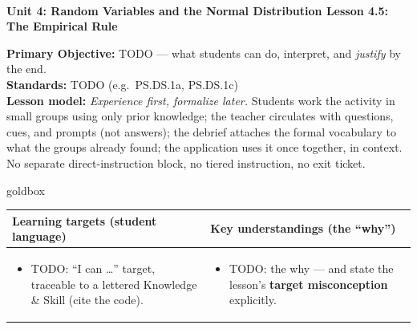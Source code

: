 \documentclass[10pt]{article}
\newcommand{\UnitNumberName}{Unit 4: Random Variables and the Normal Distribution \quad}
\newcommand{\LessonNumberName}{Lesson 4.5: The Empirical Rule}
\begin{document}
\begin{center}
    {\Large\bfseries \CourseName \\
    {\small\bfseries \UnitNumberName \LessonNumberName}}
\end{center}

\begin{tcolorbox}[colback=frost, colframe=cerulean, boxrule=0.9pt, arc=2mm,
    left=2mm, right=2mm, top=1.5mm, bottom=1.5mm]
    \textbf{Primary Objective:} TODO --- what students can do, interpret, and \emph{justify}
    by the end.
    \\[2pt]
    \textbf{Standards:} TODO (e.g.\ PS.DS.1a, PS.DS.1c)
    \\[2pt]
    \textbf{Lesson model:} \emph{Experience first, formalize later.} Students work the activity
    in small groups using only prior knowledge; the teacher circulates with questions, cues, and
    prompts (not answers); the debrief attaches the formal vocabulary to what the groups already
    found; the application uses it once together, in context. No separate direct-instruction
    block, no tiered instruction, no exit ticket.
\end{tcolorbox}

\renewcommand{\arraystretch}{1.4}
\begin{skillbox}{goldbox}
\begin{tabularx}{\linewidth}{@{}X|X@{}}
\textbf{Learning targets (student language)} & \textbf{Key understandings (the ``why'')} \\[2pt]
\hline
\vspace{-6pt}
\begin{itemize}[leftmargin=1.1em, nosep, after=\vspace{2pt}]
  \item TODO: ``I can \dots'' target, traceable to a lettered Knowledge \& Skill (cite the code).
\end{itemize}
&
\vspace{-6pt}
\begin{itemize}[leftmargin=1.1em, nosep, after=\vspace{2pt}]
  \item TODO: the why --- and state the lesson's \textbf{target misconception} explicitly.
\end{itemize}
\end{tabularx}
\end{skillbox}
\end{document}
